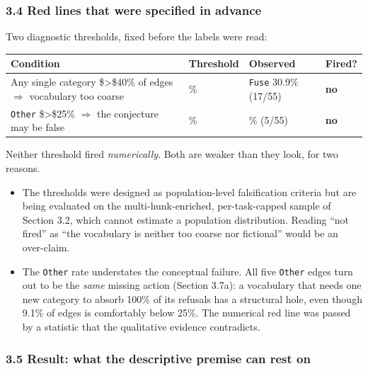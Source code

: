 \documentclass[
  11pt,
]{article}
\providecommand{\tightlist}{%
  \setlength{\itemsep}{0pt}\setlength{\parskip}{0pt}}
\begin{document}
\hypertarget{red-lines-that-were-specified-in-advance}{%
\subsubsection{3.4 Red lines that were specified in advance}\label{red-lines-that-were-specified-in-advance}}

Two diagnostic thresholds, fixed before the labels were read:

\begin{longtable}[]{@{}
  >{\raggedright\arraybackslash}p{}
  >{\raggedright\arraybackslash}p{}
  >{\raggedright\arraybackslash}p{}
  >{\raggedright\arraybackslash}p{}@{}}
\toprule
Condition & Threshold & Observed & Fired? \\
\midrule
\endhead
Any single category \$\textgreater\$40\% of edges \(\Rightarrow\) vocabulary too coarse & 40\% & \texttt{Fuse} 30.9\% (17/55) & \textbf{no} \\
\texttt{Other} \$\textgreater\$25\% \(\Rightarrow\) the conjecture may be false & 25\% & 9.1\% (5/55) & \textbf{no} \\
\bottomrule
\end{longtable}

Neither threshold fired \emph{numerically}. Both are weaker than they look, for two reasons.

\begin{itemize}
\tightlist
\item
  The thresholds were designed as population-level falsification criteria but are being evaluated on the multi-hunk-enriched, per-task-capped sample of Section 3.2, which cannot estimate a population distribution. Reading ``not fired'' as ``the vocabulary is neither too coarse nor fictional'' would be an over-claim.
\item
  The \texttt{Other} rate understates the conceptual failure. All five \texttt{Other} edges turn out to be the \emph{same} missing action (Section 3.7a): a vocabulary that needs one new category to absorb 100\% of its refusals has a structural hole, even though 9.1\% of edges is comfortably below 25\%. The numerical red line was passed by a statistic that the qualitative evidence contradicts.
\end{itemize}

\hypertarget{result-what-the-descriptive-premise-can-rest-on}{%
\subsubsection{3.5 Result: what the descriptive premise can rest on}\label{result-what-the-descriptive-premise-can-rest-on}}
\end{document}
